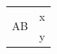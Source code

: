 \documentclass{bmvc2k}
\begin{document}
\begin{tabular}{ll}
\multirow{2}{*}{AB} & x\\
 & y\\
\end{tabular}
\end{document}
